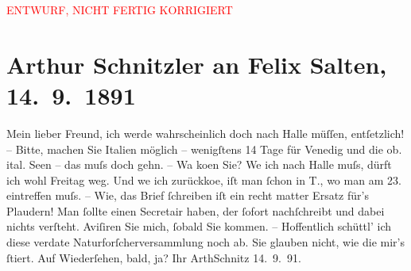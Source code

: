 
\begin{center}
            \textcolor{red}{ENTWURF, NICHT FERTIG KORRIGIERT}
                      \end{center}
            
         
         \renewcommand{\erwaehntePersonen}{Personen: Felix Salten}
         \renewcommand{\erwaehnteOrte}{Orte: Italien, Miskolc, Oberitalienische Seen, Opava, Venedig, Wien}
         \renewcommand{\erwaehnteWerke}{}
               \section[Arthur Schnitzler an Felix Salten, 14. 9. 1891]{ Arthur Schnitzler an Felix Salten, 14. 9. 1891}\nopagebreak{}\rehead{ }\begin{ledgroupsized}[t]{13cm}\normalsize\beginnumbering \toendnotes[C]{\smallbreak\pagebreak[2]} 
\pstart
           \noindent{}{\pb}Mein lieber Freund, ich werde wahrscheinlich doch nach Halle müſſen, entſetzlich! – Bitte, machen Sie
                  Italien möglich – wenigſtens 14 Tage für Venedig und die ob. ital. Seen – das muſs doch gehn. – Wa{\geminationn} ko{\geminationm}en Sie? We{\geminationn} ich nach Halle muſs, dürft ich wohl Freitag
               weg. Und we{\geminationn} ich zurückko{\geminationm}e, iſt {\pb}man ſchon in T., wo man am 23. eintreffen
               muſs. – Wie, das Brief ſchreiben iſt ein recht matter Ersatz für’s Plaudern! Man
               ſollte einen Secretair haben, der ſofort nachſchreibt und dabei nichts verſteht.
               Aviſiren Sie mich, ſobald Sie kommen. – Hoffentlich schüttl’ ich diese verda{\geminationm}te Naturforſcherversammlung noch ab. Sie glauben nicht,
               wie die mir’s ſtiert. 
            \pend
           \pstart
           {\pb}Auf Wiederſehen, bald, ja? \pend
           \pstart Ihr \spacefill\mbox{ArthSchnitz}\pend{}\pstart
           \raggedleft{}14. 9. 91.\pend
           
         
         \endnumbering{}\end{ledgroupsized}\begin{anhang}\end{anhang}\newcommand{\dateiname}{L02952}\newcommand{\titel}{Arthur Schnitzler an Felix Salten, 14. 9. 1891}\newcommand{\editorInnen}{Martin Anton Müller und Laura Untner}
      